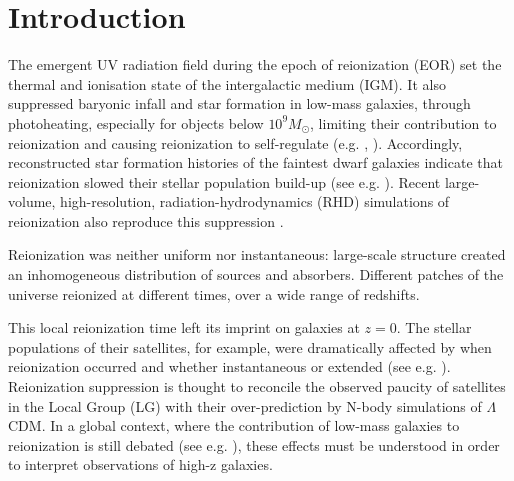 \documentclass[twocolumn]{aastex61}
\begin{document}

\section{Introduction}
The emergent UV radiation field during the epoch of reionization (EOR) set the thermal and ionisation state of the intergalactic medium (IGM). It also suppressed baryonic infall and star formation in low-mass galaxies, through photoheating, especially for objects below $10^9 M_\odot$, limiting their contribution to reionization and causing reionization to self-regulate (e.g. \citet{SGB94}, \citet{ILIEV07}). Accordingly, reconstructed star formation histories of the faintest dwarf galaxies indicate that reionization slowed their stellar population build-up (see e.g. \citet{BROWN14}). Recent large-volume, high-resolution, radiation-hydrodynamics (RHD) simulations of reionization also reproduce this suppression \citep{OCV16}. 

Reionization was neither uniform nor instantaneous: large-scale structure created an inhomogeneous distribution of sources and absorbers. Different patches of the universe reionized at different times, over a wide range of redshifts. 

This local reionization time left its imprint on galaxies at $z = 0$.
The stellar populations of their satellites, for example, were dramatically affected by when reionization occurred and whether instantaneous or extended (see e.g.
\citet{KOP9,BUS10,OCV11,ILI11,OCV14,GIL15}).
Reionization suppression is thought to reconcile the observed paucity of satellites in the Local Group (LG) with their over-prediction by N-body simulations of $\Lambda$CDM. In a global context, where the contribution of low-mass galaxies to reionization is still debated (see e.g. \citet{BOU14,FIN15}), these effects must be understood in order to interpret observations of high-z galaxies. 
\end{document}
